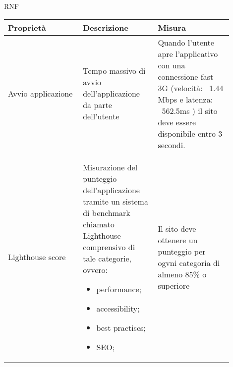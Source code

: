 \begin{listaPersonale}{RNF}
    \begin{tabular}{|p{0.3\linewidth}|p{0.3\linewidth}|p{0.3\linewidth}|}
        \hline
        \rowcolor{viola} \textbf{Proprietà}                           &
        \textbf{Descrizione}                                          &
        \textbf{Misura}                                                                   \\
        \hline
        Avvio applicazione                                            &
        Tempo massivo di avvio dell'applicazione da parte dell'utente &
        Quando l'utente apre l'applicativo con una connessione
        fast 3G (velocità: ~1.44 Mbps e latenza: ~562.5ms )
        il sito deve essere disponibile entro 3 secondi.                                  \\
        \hline
        Lighthouse score                                              &
        Misurazione del punteggio dell'applicazione tramite un
        sistema di benchmark chiamato Lighthouse comprensivo
        di tale categorie, ovvero:
        \begin{itemize}
            \item performance;
            \item accessibility;
            \item best practises;
            \item SEO;
        \end{itemize}                                         &
        Il sito deve ottenere un punteggio per ogvni categoria di almeno 85\% o superiore \\
        \hline
    \end{tabular}


\end{listaPersonale}
